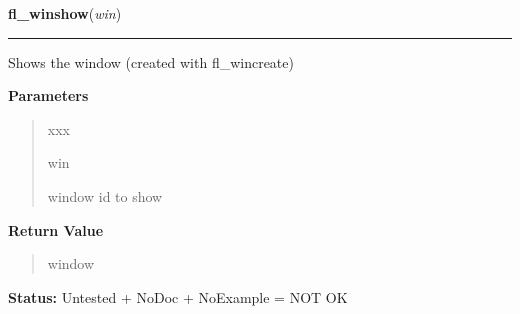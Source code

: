 \hspace{.8\funcindent}\begin{boxedminipage}{\funcwidth}

    \raggedright \textbf{fl\_winshow}(\textit{win})

    \vspace{-1.5ex}

    \rule{\textwidth}{0.5\fboxrule}
\setlength{\parskip}{2ex}
    Shows the window (created with fl\_wincreate)

\setlength{\parskip}{1ex}
      \textbf{Parameters}
      \vspace{-1ex}

      \begin{quote}
        \begin{Ventry}{xxx}

          \item[win]

          window id to show

        \end{Ventry}

      \end{quote}

      \textbf{Return Value}
    \vspace{-1ex}

      \begin{quote}
      window

      \end{quote}

\textbf{Status:} Untested + NoDoc + NoExample = NOT OK



    \end{boxedminipage}

    \label{xformslib:library:fl_winopen}

    \vspace{0.5ex}

